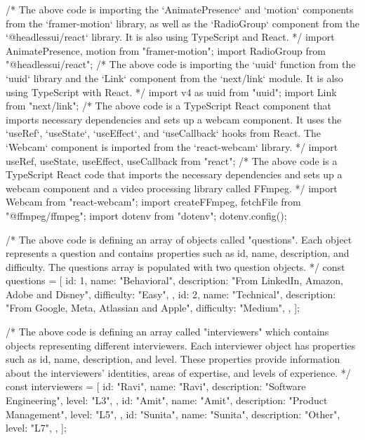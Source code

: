 /* The above code is importing the `AnimatePresence` and `motion` components from the `framer-motion`
library, as well as the `RadioGroup` component from the `@headlessui/react` library. It is also
using TypeScript and React. */
import { AnimatePresence, motion } from "framer-motion";
import { RadioGroup } from "@headlessui/react";
/* The above code is importing the `uuid` function from the `uuid` library and the `Link` component
from the `next/link` module. It is also using TypeScript with React. */
import { v4 as uuid } from "uuid";
import Link from "next/link";
/* The above code is a TypeScript React component that imports necessary dependencies and sets up a
webcam component. It uses the `useRef`, `useState`, `useEffect`, and `useCallback` hooks from React.
The `Webcam` component is imported from the `react-webcam` library. */
import { useRef, useState, useEffect, useCallback } from "react";
/* The above code is a TypeScript React code that imports the necessary dependencies and sets up a
webcam component and a video processing library called FFmpeg. */
import Webcam from "react-webcam";
import { createFFmpeg, fetchFile } from "@ffmpeg/ffmpeg";
import dotenv from "dotenv";
dotenv.config();

/* The above code is defining an array of objects called "questions". Each object represents a question
and contains properties such as id, name, description, and difficulty. The questions array is
populated with two question objects. */
const questions = [
  {
    id: 1,
    name: "Behavioral",
    description: "From LinkedIn, Amazon, Adobe and Disney",
    difficulty: "Easy",
  },
  {
    id: 2,
    name: "Technical",
    description: "From Google, Meta, Atlassian and Apple",
    difficulty: "Medium",
  },
];

/* The above code is defining an array called "interviewers" which contains objects representing
different interviewers. Each interviewer object has properties such as id, name, description, and
level. These properties provide information about the interviewers' identities, areas of expertise,
and levels of experience. */
const interviewers = [
  {
    id: "Ravi",
    name: "Ravi",
    description: "Software Engineering",
    level: "L3",
  },
  {
    id: "Amit",
    name: "Amit",
    description: "Product Management",
    level: "L5",
  },
  {
    id: "Sunita",
    name: "Sunita",
    description: "Other",
    level: "L7",
  },
];

